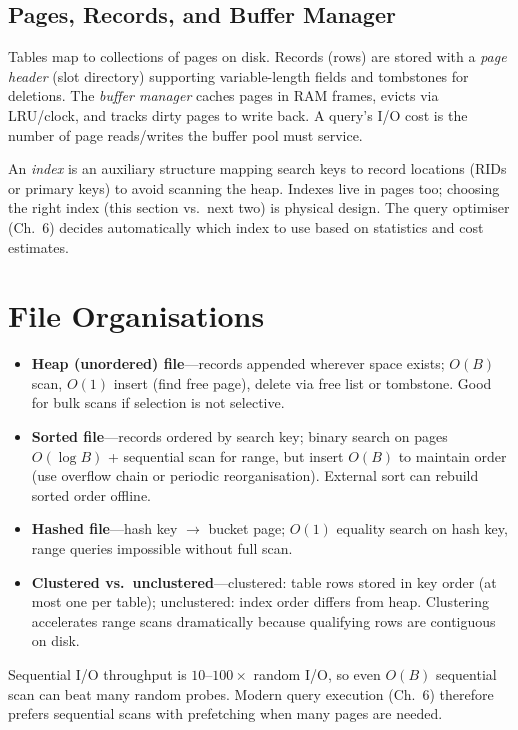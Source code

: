 \subsection{Pages, Records, and Buffer Manager}

Tables map to collections of pages on disk. Records (rows) are stored with a \emph{page header} (slot directory) supporting variable-length fields and tombstones for deletions. The \emph{buffer manager} caches pages in RAM frames, evicts via LRU/clock, and tracks dirty pages to write back. A query's I/O cost is the number of page reads/writes the buffer pool must service.

An \emph{index} is an auxiliary structure mapping search keys to record locations (RIDs or primary keys) to avoid scanning the heap. Indexes live in pages too; choosing the right index (this section vs.\ next two) is physical design. The query optimiser (Ch.~6) decides automatically which index to use based on statistics and cost estimates.

\section{File Organisations}
\label{sec:files}

\begin{itemize}
    \item \textbf{Heap (unordered) file}---records appended wherever space exists; $O(B)$ scan, $O(1)$ insert (find free page), delete via free list or tombstone. Good for bulk scans if selection is not selective.
    \item \textbf{Sorted file}---records ordered by search key; binary search on pages $O(\log B)$ + sequential scan for range, but insert $O(B)$ to maintain order (use overflow chain or periodic reorganisation). External sort can rebuild sorted order offline.
    \item \textbf{Hashed file}---hash key $\to$ bucket page; $O(1)$ equality search on hash key, range queries impossible without full scan.
    \item \textbf{Clustered vs.\ unclustered}---clustered: table rows stored in key order (at most one per table); unclustered: index order differs from heap. Clustering accelerates range scans dramatically because qualifying rows are contiguous on disk.
\end{itemize}

Sequential I/O throughput is $10$--$100\times$ random I/O, so even $O(B)$ sequential scan can beat many random probes. Modern query execution (Ch.~6) therefore prefers sequential scans with prefetching when many pages are needed.

